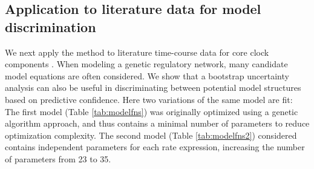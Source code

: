 \subsection{Application to literature data for model discrimination}
We next apply the method to literature time-course data for core clock
components \cite{Lee2001}. When modeling a genetic regulatory network, many
candidate model equations are often considered. We show that a bootstrap
uncertainty analysis can also be useful in discriminating between potential
model structures based on predictive confidence. Here two variations of the
same model are fit: The first model (Table \ref{tab:modelfns}) was originally
optimized using a genetic algorithm approach, and thus contains a minimal
number of parameters to reduce optimization complexity. The second model (Table \ref{tab:modelfns2}) 
considered  contains independent parameters for each rate
expression, increasing the number of parameters from 23 to 35. 

